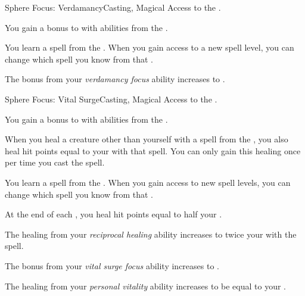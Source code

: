     \begin{feat}{Sphere Focus: Verdamancy}{Casting, Magical}
        \featpre Access to the  .

         You gain a  bonus to  with abilities from the  .

         You learn a spell from the  .
        When you gain access to a new spell level, you can change which spell you know from that .

         The bonus from your \textit{verdamancy focus} ability increases to .
    \end{feat}

    \begin{feat}{Sphere Focus: Vital Surge}{Casting, Magical}
        \featpre Access to the  .

         You gain a  bonus to  with abilities from the  .

         When you heal a creature other than yourself with a spell from the  , you also heal hit points equal to your  with that spell.
        You can only gain this healing once per time you cast the spell.

         You learn a spell from the  .
        When you gain access to new spell levels, you can change which spell you know from that .

         At the end of each , you heal hit points equal to half your .

         The healing from your \textit{reciprocal healing} ability increases to twice your  with the spell.

         The bonus from your \textit{vital surge focus} ability increases to .

         The healing from your \textit{personal vitality} ability increases to be equal to your .
    \end{feat}

